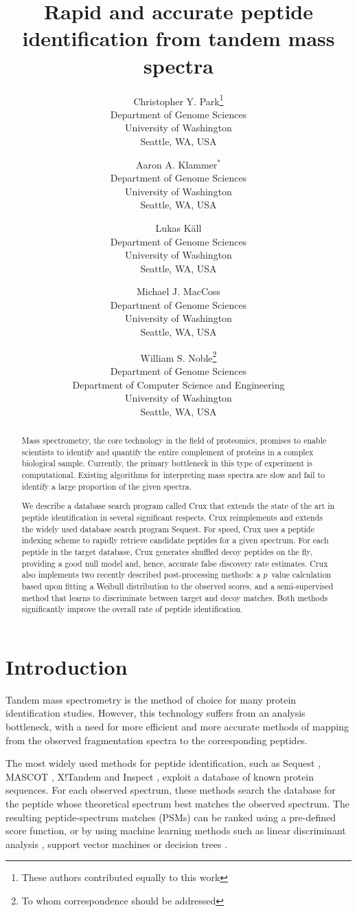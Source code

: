 \documentclass[12pt]{article}
\title{Rapid and accurate peptide identification from tandem mass
  spectra}
\author{Christopher Y. Park\footnote{These authors contributed equally 
to this work}\\
Department of Genome Sciences\\
University of Washington\\
Seattle, WA, USA
\and
Aaron A. Klammer$^*$\\
Department of Genome Sciences\\
University of Washington\\
Seattle, WA, USA
\and
Lukas K\"{a}ll\\
Department of Genome Sciences\\
University of Washington\\
Seattle, WA, USA
\and
Michael J. MacCoss\\
Department of Genome Sciences\\
University of Washington\\
Seattle, WA, USA
\and
William S. Noble\footnote{To whom correspondence should
  be addressed}\\
Department of Genome Sciences\\
Department of Computer Science and Engineering\\
University of Washington\\
Seattle, WA, USA
}
\begin{document}
\maketitle

\begin{abstract}
Mass spectrometry, the core technology in the field of proteomics,
promises to enable scientists to identify and quantify the entire
complement of proteins in a complex biological sample.  Currently, the
primary bottleneck in this type of experiment is computational.
Existing algorithms for interpreting mass spectra are slow and fail to
identify a large proportion of the given spectra.

We describe a database search program called Crux that extends the
state of the art in peptide identification in several significant
respects.  Crux reimplements and extends the widely used database
search program {\sc Sequest}.  For speed, Crux uses a peptide indexing
scheme to rapidly retrieve candidate peptides for a given spectrum.
For each peptide in the target database, Crux generates shuffled decoy
peptides on the fly, providing a good null model and, hence, accurate
false discovery rate estimates.  Crux also implements two recently
described post-processing methods: a $p$~value calculation based upon
fitting a Weibull distribution to the observed scores, and a
semi-supervised method that learns to discriminate between target and
decoy matches.  Both methods significantly improve the overall rate of
peptide identification.
\end{abstract}

\section{Introduction}

Tandem mass spectrometry is the method of choice for many protein
identification studies.  However, this technology suffers from an
analysis bottleneck, with a need for more efficient and more accurate
methods of mapping from the observed fragmentation spectra to the
corresponding peptides.

The most widely used methods for peptide identification, such as
{\sc Sequest} \cite{eng:approach}, MASCOT \cite{perkins:probability},
X!Tandem \cite{craig:tandem} and Inspect \cite{tanner:inspect},
exploit a database of known protein sequences.  For each observed
spectrum, these methods search the database for the peptide whose
theoretical spectrum best matches the observed spectrum.  The
resulting peptide-spectrum matches (PSMs) can be ranked using a
pre-defined score function, or by using machine learning methods such
as linear discriminant analysis \cite{keller:empirical}, support
vector machines \cite{anderson:new, kall:semi-supervised} or decision
trees \cite{elias:intensity}.
\end{document}
